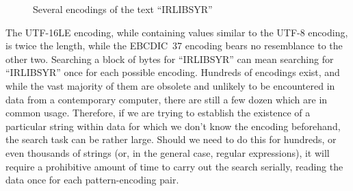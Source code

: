 \documentclass[5p,final,number,sort&compress]{elsarticle}
\begin{document}
\begin{figure}[th]
\caption{Several encodings of the text ``IRLIBSYR''\label{fig:enc}}
\end{figure}

The UTF-16LE encoding, while containing values similar to the UTF-8 encoding, is twice the length, while the EBCDIC~37 encoding bears no resemblance to the other two. Searching a block of bytes for ``IRLIBSYR'' can mean searching for ``IRLIBSYR'' once for each possible encoding. Hundreds of encodings exist, and while the vast majority of them are obsolete and unlikely to be encountered in data from a contemporary computer, there are still a few dozen which are in common usage. Therefore, if we are trying to establish the existence of a particular string within data for which we don't know the encoding beforehand, the search task can be rather large. Should we need to do this for hundreds, or even thousands of strings (or, in the general case, regular expressions), it will require a prohibitive amount of time to carry out the search serially, reading the data once for each pattern-encoding pair.
\end{document}
